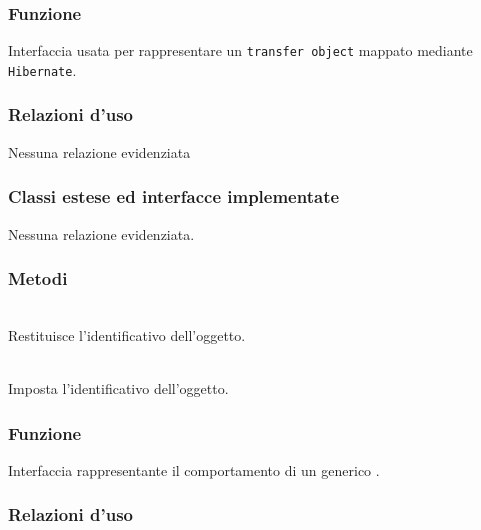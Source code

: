 

\subsubsection*{Funzione}
Interfaccia usata per rappresentare un \texttt{transfer object} mappato mediante \texttt{Hibernate}.

\subsubsection*{Relazioni d'uso}

Nessuna relazione evidenziata

\subsubsection*{Classi estese ed interfacce implementate}

Nessuna relazione evidenziata.

\subsubsection*{Metodi}
\begin{description}
	\item{}\\
	Restituisce l'identificativo dell'oggetto.
	\item{}\\
	Imposta l'identificativo dell'oggetto.
\end{description}


\subsubsection*{Funzione}
Interfaccia rappresentante il comportamento di un generico .

\subsubsection*{Relazioni d'uso}


